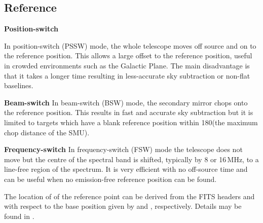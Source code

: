\documentclass[11pt,oneside,chapters]{starlink}
\begin{document}
\subsection{Reference}
\label{sec:reference_mode}

\begin{aligndesc}
\item[\textbf{Position-switch}]

In position-switch (PSSW) mode, the whole telescope moves off source
and on to the reference position. This allows a large offset to the
reference position, useful in crowded environments such as the Galactic
Plane. The main disadvantage is that it takes a longer time resulting
in less-accurate sky subtraction or non-flat baselines.

\item[\textbf{Beam-switch}]
In beam-switch (BSW) mode, the secondary mirror chops onto the reference
position. This results in fast and accurate sky subtraction but it is
limited to targets which have a blank reference position within
180\arcsec (the maximum chop distance of the SMU).

\item[\textbf{Frequency-switch}]
In frequency-switch (FSW) mode the telescope does not move but the
centre of the spectral band is shifted, typically by 8 or 16\,MHz,
to a line-free region of the spectrum. It is very efficient with no
off-source time and can be
useful when no emission-free reference position can be found.
\end{aligndesc}

\begin{tip}
The location of of the reference point can be derived from the FITS headers
 and  with respect to the base position
given by  and , respectively.  Details
may be found in .
\end{tip}
\end{document}
